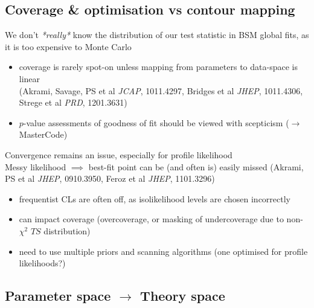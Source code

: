 \documentclass[xcolor=dvipsnames]{beamer}
\newcommand{\cblue}[1]{{\color[rgb]{0.1, 0.0, 0.6} #1}}
\begin{document}
\subsection{Coverage \& optimisation vs contour mapping}

\cblue{We don't \textit{*really*} know the distribution of our test statistic in BSM global fits, as it is too expensive to Monte Carlo}
      \begin{itemize}\footnotesize
                 \item coverage is rarely spot-on unless mapping from parameters to data-space is linear \\
                 {\tiny(Akrami, Savage, PS et al {\it JCAP}, 1011.4297, Bridges et al {\it JHEP}, 1011.4306, Strege et al {\it PRD}, 1201.3631)}
                 \item $p$-value assessments of goodness of fit should be viewed with scepticism ($\rightarrow$MasterCode)
                 \end{itemize}
\cblue{Convergence remains an issue, especially for profile likelihood}\\
Messy likelihood $\implies$ best-fit point can be (and often is) easily missed {\tiny(Akrami, PS et al {\it JHEP}, 0910.3950, Feroz et al {\it JHEP}, 1101.3296)}
      \begin{itemize}\footnotesize
                 \item frequentist CLs are often off, as isolikelihood levels are chosen incorrectly
                 \item can impact coverage (overcoverage, or masking of undercoverage due to non-$\chi^2$ $TS$ distribution)
                 \item need to use multiple priors and scanning algorithms (one optimised for profile likelihoods?)  
                 \end{itemize}


\subsection{Parameter space $\rightarrow$ Theory space}
\end{document}
